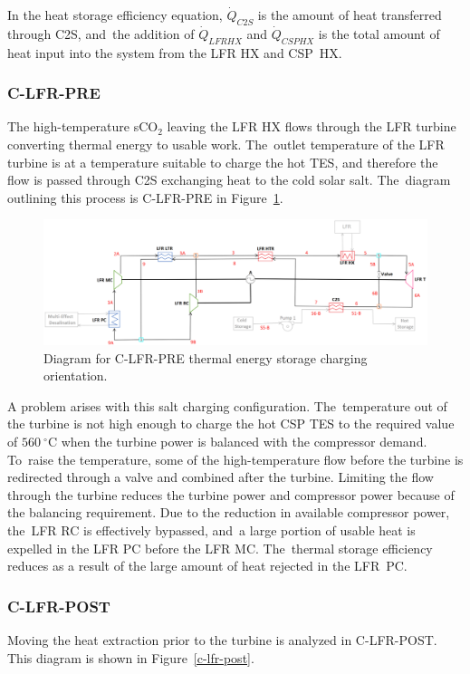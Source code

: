 \documentclass[sustainability,article,accept,moreauthors,pdftex]{Definitions/mdpi}
\begin{document}
\begin{paracol}{2}
In the heat storage efficiency equation, $\dot{Q}_{C2S}$ is the amount of heat transferred through C2S, and~the addition of $\dot{Q}_{LFRHX}$ and $\dot{Q}_{CSPHX}$ is the total amount of heat input into the system from the LFR HX and CSP~HX. 

\subsubsection{C-LFR-PRE} 

The high-temperature sCO$_2$ leaving the LFR HX flows through the LFR turbine converting thermal energy to usable work. The~outlet temperature of the LFR turbine is at a temperature suitable to charge the hot TES, and therefore the flow is passed through C2S exchanging heat to the cold solar salt. The~diagram outlining this process is C-LFR-PRE in Figure~\ref{c-lfr-pre}. 

\end{paracol}
\begin{figure}[H]
    \widefigure
    \includegraphics[width=\linewidth]{Definitions/c-lfr-pre.pdf}
    \caption{Diagram for C-LFR-PRE thermal energy storage charging orientation\label{c-lfr-pre}.}
\end{figure}
\begin{paracol}{2}
\switchcolumn

A problem arises with this salt charging configuration. The~temperature out of the turbine is not high enough to charge the hot CSP TES to the required value of $560~^{\circ}$C when the turbine power is balanced with the compressor demand. To~raise the temperature, some of the high-temperature flow before the turbine is redirected through a valve and combined after the turbine. Limiting the flow through the turbine reduces the turbine power and compressor power because of the balancing requirement. Due to the reduction in available compressor power, the~LFR RC is effectively bypassed, and~a large portion of usable heat is expelled in the LFR PC before the LFR MC. The~thermal storage efficiency reduces as a result of the large amount of heat rejected in the LFR~PC. 



\subsubsection{C-LFR-POST} 

Moving the heat extraction prior to the turbine is analyzed in C-LFR-POST. This diagram is shown in Figure~\ref{c-lfr-post}.

\end{paracol}
\end{document}
